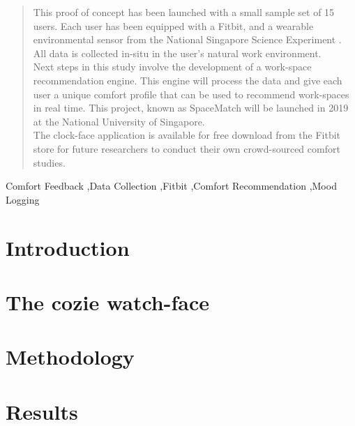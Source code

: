 \documentclass[preprint,11pt,3p]{elsarticle} %
\begin{document}
\begin{frontmatter}
\begin{abstract}
This proof of concept has been launched with a small sample set of 15 users. Each user has been equipped with a Fitbit, and a wearable environmental sensor from the National Singapore Science Experiment \cite{wilhelm2016wearable}. All data is collected in-situ in the user's natural work environment. \\

Next steps in this study involve the development of a work-space recommendation engine. This engine will process the data and give each user a unique comfort profile that can be used to recommend work-spaces in real time. This project, known as SpaceMatch will be launched in 2019 at the National University of Singapore. \\

The clock-face application is available for free download from the Fitbit store for future researchers to conduct their own crowd-sourced comfort studies.

\end{abstract}

\begin{keyword}
Comfort Feedback \sep Data Collection \sep Fitbit \sep Comfort Recommendation \sep Mood Logging
\end{keyword}

\end{frontmatter}

\section{Introduction}
\label{ch:introduction}


\section{The cozie watch-face}
\label{ch:cozie}


\section{Methodology}
\label{ch:method}


\section{Results}
\label{ch:results}



% 
\end{document}
